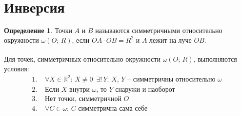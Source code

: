 \documentclass[12pt]{article}
\theoremstyle{definition}
\newtheorem{definition}{Определение}
\newcommand{\R}{\mathbb{R}}
\begin{document}
    \section{Инверсия}
    \begin{definition}
        Точки $A$ и $B$ называются симметричными относительно окружности $\omega(O;\,R)$, если $OA\cdot OB=R^2$ и $A$ лежит на луче $OB$.\\\\
        Для точек, симметричных относительно окружности $\omega(O;\,R)$, выполняются условия:
        \begin{align*}
            1.\,\,&\forall X\in \R^2:\,X\neq0\,\,\,\exists!\,Y:\,X,\,Y \text{ -- симметричны относительно } \omega\\
            2.\,\,&\text{Если } X \text{ внутри } \omega\text{, то } Y \text{ снаружи и наоборот}\\
            3.\,\,&\text{Нет точки, симметричной } O\\
            4.\,\,&\forall C \in \omega:\,C \text{ симметрична сама себе}
        \end{align*}
    \end{definition}
\end{document}
